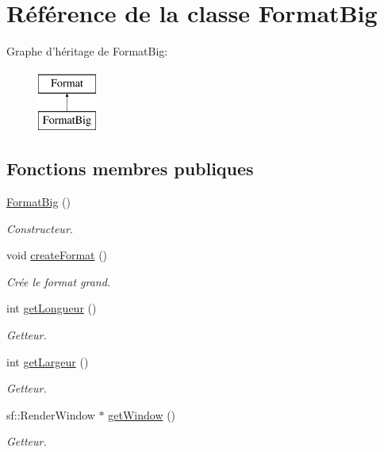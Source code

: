 \hypertarget{classFormatBig}{\section{Référence de la classe Format\+Big}
\label{classFormatBig}
}
Graphe d'héritage de Format\+Big\+:\begin{figure}[H]
\begin{center}
\leavevmode
\includegraphics[height=2.000000cm]{classFormatBig}
\end{center}
\end{figure}
\subsection*{Fonctions membres publiques}
\begin{DoxyCompactItemize}
\item 
\hypertarget{classFormatBig_a705324cfcf29ccce442adbd5b327b821}{\hyperlink{classFormatBig_a705324cfcf29ccce442adbd5b327b821}{Format\+Big} ()}\label{classFormatBig_a705324cfcf29ccce442adbd5b327b821}

\begin{DoxyCompactList}\small\item\em Constructeur. \end{DoxyCompactList}\item 
void \hyperlink{classFormatBig_a1c0bbd51c2093997c75624682dba8772}{create\+Format} ()
\begin{DoxyCompactList}\small\item\em Crée le format grand. \end{DoxyCompactList}\item 
int \hyperlink{classFormatBig_ae244731f051e849ce816189283d452f4}{get\+Longueur} ()
\begin{DoxyCompactList}\small\item\em Getteur. \end{DoxyCompactList}\item 
int \hyperlink{classFormatBig_acf985751797a389460bf4b5271ffbad4}{get\+Largeur} ()
\begin{DoxyCompactList}\small\item\em Getteur. \end{DoxyCompactList}\item 
sf\+::\+Render\+Window $\ast$ \hyperlink{classFormatBig_a48f6f2efc1d7d40f7562b8f1430f36c7}{get\+Window} ()
\begin{DoxyCompactList}\small\item\em Getteur. \end{DoxyCompactList}\end{DoxyCompactItemize}


